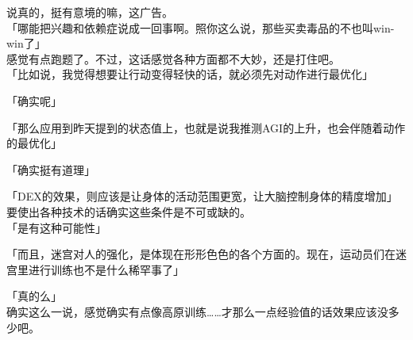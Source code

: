 说真的，挺有意境的嘛，这广告。\\

「哪能把兴趣和依赖症说成一回事啊。照你这么说，那些买卖毒品的不也叫win-win了」\\

感觉有点跑题了。不过，这话感觉各种方面都不大妙，还是打住吧。\\

「比如说，我觉得想要让行动变得轻快的话，就必须先对动作进行最优化」

「确实呢」

「那么应用到昨天提到的状态值上，也就是说我推测AGI的上升，也会伴随着动作的最优化」

「确实挺有道理」

「DEX的效果，则应该是让身体的活动范围更宽，让大脑控制身体的精度增加」\\

要使出各种技术的话确实这些条件是不可或缺的。\\

「是有这种可能性」

「而且，迷宫对人的强化，是体现在形形色色的各个方面的。现在，运动员们在迷宫里进行训练也不是什么稀罕事了」

「真的么」\\

确实这么一说，感觉确实有点像高原训练……才那么一点经验值的话效果应该没多少吧。

